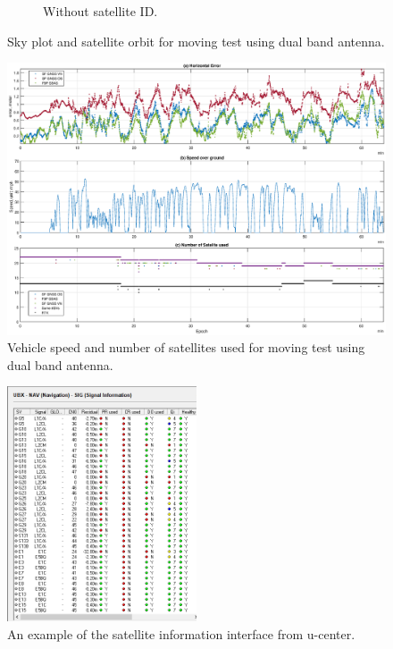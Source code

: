 \documentclass[letterpaper, 10 pt,onecolumn]{article}
\begin{document}
\begin{figure}[H]
\begin{subfigure}{.5\textwidth}
			\caption{	
				Without satellite ID.}
			\label{fig:mt2_obt}
		\end{subfigure}
		\caption[short]{Sky plot and satellite orbit for moving test using dual band antenna.}
		\label{fig:mt2}
	\end{figure}

	\begin{figure}[H]
		\centering
		\includegraphics[width=\textwidth]{figures/dynamicinfo_dual.eps}
		\caption{Vehicle speed and number of satellites used for moving test using dual band antenna.}
		\label{fig:m2vspeed}
	\end{figure}

	\begin{figure}[H]
		\centering
		\includegraphics[width=0.5\textwidth]{figures/nav_sig.png}
		\caption{An example of the satellite information interface from u-center.}
		\label{fig:ubxqi}
	\end{figure}

    
    
\end{document}
